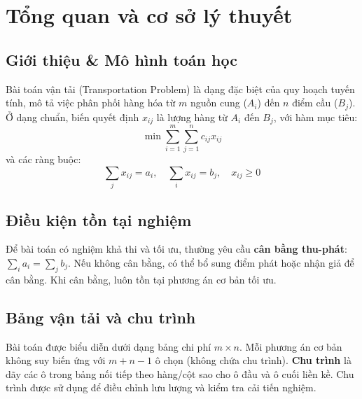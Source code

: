 \chapter{Tổng quan và cơ sở lý thuyết}
\section{Giới thiệu \& Mô hình toán học}
Bài toán vận tải (Transportation Problem) là dạng đặc biệt của quy hoạch tuyến tính, mô tả việc phân phối hàng hóa từ $m$ nguồn cung ($A_i$) đến $n$ điểm cầu ($B_j$). Ở dạng chuẩn, biến quyết định $x_{ij}$ là lượng hàng từ $A_i$ đến $B_j$, với hàm mục tiêu:
\[
\min \sum_{i=1}^m \sum_{j=1}^n c_{ij} x_{ij}
\]
và các ràng buộc:
\[
\sum_j x_{ij} = a_i,\quad \sum_i x_{ij} = b_j,\quad x_{ij} \geq 0
\]

\section{Điều kiện tồn tại nghiệm}
Để bài toán có nghiệm khả thi và tối ưu, thường yêu cầu \textbf{cân bằng thu-phát}: $\sum_i a_i = \sum_j b_j$. Nếu không cân bằng, có thể bổ sung điểm phát hoặc nhận giả để cân bằng. Khi cân bằng, luôn tồn tại phương án cơ bản tối ưu.

\section{Bảng vận tải và chu trình}
Bài toán được biểu diễn dưới dạng bảng chi phí $m \times n$. Mỗi phương án cơ bản không suy biến ứng với $m+n-1$ ô chọn (không chứa chu trình). \textbf{Chu trình} là dãy các ô trong bảng nối tiếp theo hàng/cột sao cho ô đầu và ô cuối liền kề. Chu trình được sử dụng để điều chỉnh lưu lượng và kiểm tra cải tiến nghiệm.
